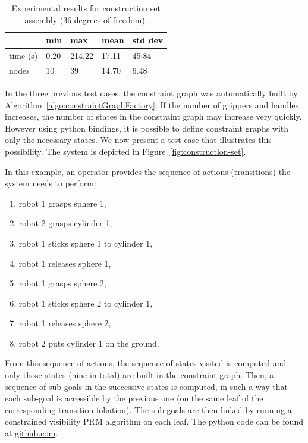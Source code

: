 \begin{table}
  \begin{center}
  \begin{tabular}{|l|l|l|l|l|}
    \hline
    & min & max & mean & std dev \\
    \hline
    time (s) & 0.20 & 214.22 & 17.11 & 45.84 \\
    nodes & 10 &  39 & 14.70 & 6.48 \\
    \hline
  \end{tabular}
  \end{center}
  \caption{Experimental results for construction set assembly
    {\color{blue}(36 degrees of freedom)}.}
  \label{tab:construction-set}
\end{table}

In the three previous test cases, the constraint graph was automatically built
by Algorithm~\ref{algo:constraintGraphFactory}. If the number of grippers
and handles increases, the number of states in the constraint graph may increase very
quickly. However using python bindings, it is possible to define constraint
graphs with only the necessary states. We now present a test case that
illustrates this possibility. The system is depicted in Figure~\ref{fig:construction-set}.

In this example, an operator provides the sequence of actions (transitions)
the system needs to perform:
\begin{enumerate}
\item robot 1 grasps sphere 1,
\item robot 2 grasps cylinder 1,
\item robot 1 sticks sphere 1 to cylinder 1,
\item robot 1 releases sphere 1,
\item robot 1 grasps sphere 2,
\item robot 1 sticks sphere 2 to cylinder 1,
\item robot 1 releases sphere 2,
\item robot 2 puts cylinder 1 on the ground.
\end{enumerate}
From this sequence of actions, the sequence of states visited is
computed and only those states (nine in total) are built in the
constraint graph. Then, a sequence of sub-goals in the successive
states is computed, in such a way that each sub-goal is accessible by
the previous one (on the same leaf of the corresponding transition
foliation). The sub-goals are then linked by running a constrained visibility
PRM algorithm \cite{SimLauNis00} on each leaf. The python code can be found
at \href{https://github.com/humanoid-path-planner/hpp_benchmark/blob/master/2020-07-23/construction-set/script.py}{github.com}.

